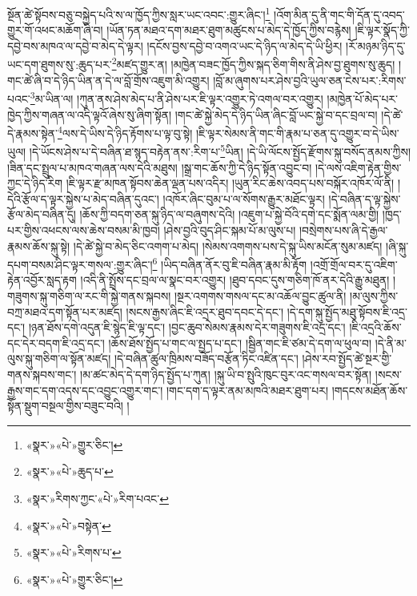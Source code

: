 སྔོན་ཚེ་སྟོབས་བཅུ་བསྐྱེད་པའི་ས་ལ་ཁྱོད་ཀྱིས་སླར་ཡང་འབང་:གྱུར་ཞིང་།\footnote{«སྣར་»«པེ་»གྱུར་ཅིང་།} །འོག་མིན་དུ་ནི་གང་གི་དོན་དུ་འབད་གྱུར་གོ་འཕང་མཆོག་ཞི་བ། །ཡོན་ཏན་མཐའ་དག་མཐར་ཐུག་མཚུངས་པ་མེད་དེ་ཁྱོད་ཀྱིས་བརྙེས། །ཇི་ལྟར་སྣོད་ཀྱི་དབྱེ་བས་མཁའ་ལ་དབྱེ་བ་མེད་དེ་ལྟར། །དངོས་བྱས་དབྱེ་བ་འགའ་ཡང་དེ་ཉིད་ལ་མེད་དེ་ཡི་ཕྱིར། །རོ་མཉམ་ཉིད་དུ་ཡང་དག་ཐུགས་སུ་:ཆུད་པར་\footnote{«སྣར་»«པེ་»ཆུད་པ་}མཛད་གྱུར་ན། །མཁྱེན་བཟང་ཁྱོད་ཀྱིས་སྐད་ཅིག་གིས་ནི་ཤེས་བྱ་ཐུགས་སུ་ཆུད། །གང་ཚེ་ཞི་བ་དེ་ཉིད་ཡིན་ན་དེ་ལ་བློ་གྲོས་འཇུག་མི་འགྱུར། །བློ་མ་ཞུགས་པར་ཤེས་བྱའི་ཡུལ་ཅན་ངེས་པར་:རིགས་པའང་\footnote{«སྣར་»རིགས་ཀྱང་«པེ་»རིག་པའང་}མ་ཡིན་ལ། །ཀུན་ནས་ཤེས་མེད་པ་ནི་ཤེས་པར་ཇི་ལྟར་འགྱུར་ཏེ་འགལ་བར་འགྱུར། །མཁྱེན་པོ་མེད་པར་ཁྱེད་ཀྱིས་གཞན་ལ་འདི་ལྟའོ་ཞེས་སུ་ཞིག་སྟོན། །གང་ཚེ་སྐྱེ་མེད་དེ་ཉིད་ཡིན་ཞིང་བློ་ཡང་སྐྱེ་བ་དང་བྲལ་བ། །དེ་ཚེ་དེ་རྣམས་སྟེན་\footnote{«སྣར་»«པེ་»བསྟེན་}ལས་དེ་ཡིས་དེ་ཉིད་རྟོགས་པ་ལྟ་བུ་སྟེ། །ཇི་ལྟར་སེམས་ནི་གང་གི་རྣམ་པ་ཅན་དུ་འགྱུར་བ་དེ་ཡིས་ཡུལ། །དེ་ཡོངས་ཤེས་པ་དེ་བཞིན་ཐ་སྙད་བརྟེན་ནས་:རིག་པ་\footnote{«སྣར་»«པེ་»རིགས་པ་}ཡིན། །དེ་ཡི་ལོངས་སྤྱོད་རྫོགས་སྐུ་བསོད་ནམས་ཀྱིས། །ཟིན་དང་སྤྲུལ་པ་མཁའ་གཞན་ལས་དེའི་མཐུས། །སྒྲ་གང་ཆོས་ཀྱི་དེ་ཉིད་སྟོན་འབྱུང་བ། །དེ་ལས་འཇིག་རྟེན་གྱིས་ཀྱང་དེ་ཉིད་རིག །ཇི་ལྟར་རྫ་མཁན་སྟོབས་ཆེན་ལྡན་པས་འདིར། །ཡུན་རིང་ཆེས་འབད་པས་བསྐོར་འཁོར་ལོ་ནི། །དེའི་རྩོལ་ད་ལྟར་སྐྱེས་པ་མེད་བཞིན་དུའང་། །འཁོར་ཞིང་བུམ་པ་ལ་སོགས་རྒྱུར་མཐོང་ལྟར། །དེ་བཞིན་ད་ལྟ་སྐྱེས་རྩོལ་མེད་བཞིན་དུ། །ཆོས་ཀྱི་བདག་ཅན་སྐུ་ཉིད་ལ་བཞུགས་དེའི། །འཇུག་པ་སྐྱེ་བོའི་དགེ་དང་སྨོན་ལམ་གྱི། །ཁྱད་པར་གྱིས་འཕངས་ལས་ཆེས་བསམ་མི་ཁྱབ། །ཤེས་བྱའི་བུད་ཤིང་སྐམ་པོ་མ་ལུས་པ། །བསྲེགས་པས་ཞི་དེ་རྒྱལ་རྣམས་ཆོས་སྐུ་སྟེ། །དེ་ཚེ་སྐྱེ་བ་མེད་ཅིང་འགག་པ་མེད། །སེམས་འགགས་པས་དེ་སྐུ་ཡིས་མངོན་སུམ་མཛད། །ཞི་སྐུ་དཔག་བསམ་ཤིང་ལྟར་གསལ་:གྱུར་ཞིང་།\footnote{«སྣར་»«པེ་»གྱུར་ཅིང་།} །ཡིད་བཞིན་ནོར་བུ་ཇི་བཞིན་རྣམ་མི་རྟོག །འགྲོ་གྲོལ་བར་དུ་འཇིག་རྟེན་འབྱོར་སླད་རྟག །འདི་ནི་སྤྲོས་དང་བྲལ་ལ་སྣང་བར་འགྱུར། །ཐུབ་དབང་དུས་གཅིག་ཁོ་ནར་དེའི་རྒྱུ་མཐུན། །གཟུགས་སྐུ་གཅིག་ལ་རང་གི་སྐྱེ་གནས་སྐབས། །སྔར་འགགས་གསལ་དང་མ་འཆོལ་བྱུང་ཚུལ་ནི། །མ་ལུས་ཀྱིས་བཀྲ་མཐའ་དག་སྟོན་པར་མཛད། །སངས་རྒྱས་ཞིང་ཇི་འདྲར་ཐུབ་དབང་དེ་དང་། །དེ་དག་སྐུ་སྤྱོད་མཐུ་སྟོབས་ཇི་འདྲ་དང་། །ཉན་ཐོས་དགེ་འདུན་ཇི་སྙེད་ཇི་ལྟ་དང་། །བྱང་ཆུབ་སེམས་རྣམས་དེར་གཟུགས་ཇི་འདྲ་དང་། །ཇི་འདྲའི་ཆོས་དང་དེར་བདག་ཇི་འདྲ་དང་། །ཆོས་ཐོས་སྤྱོད་པ་གང་ལ་སྤྱད་པ་དང་། །སྦྱིན་གང་ཇི་ཙམ་དེ་དག་ལ་ཕུལ་བ། །དེ་ནི་མ་ལུས་སྐུ་གཅིག་ལ་སྟོན་མཛད། །དེ་བཞིན་ཚུལ་ཁྲིམས་བཟོད་བརྩོན་ཏིང་འཛིན་དང་། །ཤེས་རབ་སྤྱོད་ཚེ་སྔར་གྱི་གནས་སྐབས་གང་། །མ་ཚང་མེད་དེ་དག་ཉིད་སྤྱོད་པ་ཀུན། །སྐུ་ཡི་བ་སྤུའི་ཁུང་བུར་འང་གསལ་བར་སྟོན། །སངས་རྒྱས་གང་དག་འདས་དང་འབྱུང་འགྱུར་གང་། །གང་དག་ད་ལྟར་ནམ་མཁའི་མཐར་ཐུག་པར། །གདངས་མཐོན་ཆོས་སྟོན་སྡུག་བསྔལ་གྱིས་བཟུང་བའི། །
